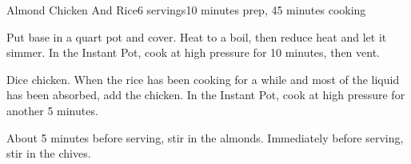 \documentclass[../Cookbook.tex]{subfiles}
\begin{document}
\begin{recipe}{Almond Chicken And Rice}{6 servings}{10 minutes prep, 45 minutes cooking}

	Put base in a  quart pot and cover. Heat to a boil, then reduce heat and let it simmer.
	In the Instant Pot, cook at high pressure for 10 minutes, then vent.

	Dice chicken. When the rice has been cooking for a while and most of the liquid has been absorbed, add the chicken.
	In the Instant Pot, cook at high pressure for another 5 minutes.

	About 5 minutes before serving, stir in the almonds. Immediately before serving, stir in the chives.

\end{recipe}
\end{document}
